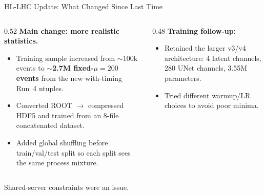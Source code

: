 \documentclass[xcolor=table,aspectratio=169]{beamer}
\begin{document}

\begin{frame}{HL-LHC Update: What Changed Since Last Time}
    \begin{columns}[t]
        \begin{column}{0.52\linewidth}
            \small
            \textbf{Main change: more realistic statistics.}
            \vspace{0.4em}
            \begin{itemize}\setlength\itemsep{0.35em}
                \item Training sample increased from $\sim$100k events to
                \textbf{$\sim$2.7M fixed-$\mu=200$ events}
                from the new with-timing Run~4 ntuples.
                \item Converted ROOT $\to$ compressed HDF5 and trained from an
                8-file concatenated dataset.
                \item Added global shuffling before train/val/test split so each
                split sees the same process mixture.
            \end{itemize}
        \end{column}
        \begin{column}{0.48\linewidth}
            \small
            \textbf{Training follow-up:}
            \vspace{0.4em}
            \begin{itemize}\setlength\itemsep{0.35em}
                \item Retained the larger v3/v4 architecture:
                4 latent channels, 280 UNet channels, 3.55M parameters.
                \item Tried different warmup/LR choices to avoid poor minima.
            \end{itemize}
        \end{column}
    \end{columns}
    \vspace{0.4em}
    \centering
    {\footnotesize\textcolor{black!60}{Shared-server constraints were an issue.}}
\end{frame}
\end{document}
